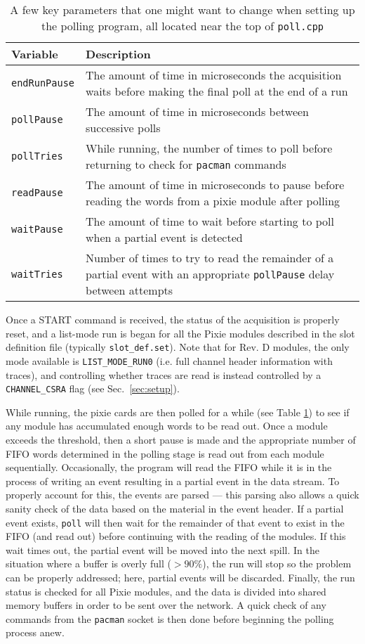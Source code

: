 \documentclass[10pt]{article}
\begin{document}
\begin{table}[htp]
\label{tab:poll_parameters}
\caption{A few key parameters that one might want to change when setting up the 
polling program, all located near the top of \texttt{poll.cpp}}
\begin{tabular}{lp{3.5in}}
\hline
Variable & Description \\
\hline
\texttt{endRunPause} & The amount of time in microseconds the acquisition waits 
before making the final poll at the end of a run \\ 
\texttt{pollPause} & The amount of time in microseconds between successive 
polls \\
\texttt{pollTries} & While running, the number of times to poll before returning 
to check for \texttt{pacman} commands \\
\texttt{readPause} & The amount of time in microseconds to pause before reading 
the words from a pixie module after polling \\
\texttt{waitPause} & The amount of time to wait before starting to poll when a
partial event is detected \\
\texttt{waitTries} & Number of times to try to read the remainder of a partial
event with an appropriate \texttt{pollPause} delay between attempts \\
\end{tabular}
\end{table}

Once a \textsc{START} command is received, the status of the acquisition is 
properly reset, and a list-mode run is began for all the Pixie modules 
described in the slot definition file (typically \texttt{slot\_def.set}). Note 
that for Rev. D modules, the only mode available is \texttt{LIST\_MODE\_RUN0} 
(i.e. full channel header information with traces), and controlling whether 
traces are read is instead controlled by a \texttt{CHANNEL\_CSRA} flag (see 
Sec.~\ref{sec:setup}).

While running, the pixie cards are then polled for a while (see Table
\ref{tab:poll_parameters}) to see if any module has accumulated enough words
to be read out. Once a module exceeds the threshold, then a short pause is
made and the appropriate number of FIFO words determined in the polling stage
is read out from each module sequentially. Occasionally, the program will read
the FIFO while it is in the process of writing an event resulting in a partial
event in the data stream. To properly account for this, the events are parsed
--- this parsing also allows a quick sanity check of the data based on the
material in the event header. If a partial event exists, \texttt{poll} will
then wait for the remainder of that event to exist in the FIFO (and read out)
before continuing with the reading of the modules. If this wait times out, the
partial event will be moved into the next spill. In the situation where a buffer
is overly full ($>90\%$), the run will stop so the problem can be properly 
addressed; here, partial events will be discarded. Finally, the run status is 
checked for all Pixie modules, and the data is divided into shared memory 
buffers in order to be sent over the network. A quick check of any commands 
from the \texttt{pacman} socket is then done before beginning the polling 
process anew.
\end{document}
